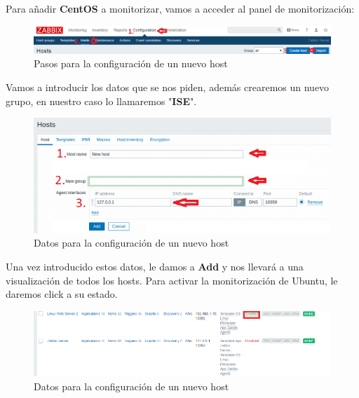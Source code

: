 \documentclass[12pt,a4paper]{article}
\begin{document}
		Para añadir \textbf{CentOS} a monitorizar, vamos a acceder al panel de monitorización:
		
		\begin{figure}[h]
			\centering
			\includegraphics[width=1.0\textwidth]{images/host.png}
			\caption{Pasos para la configuración de un nuevo host}
		\end{figure}
		Vamos a introducir los datos que se nos piden, además crearemos un nuevo grupo, en nuestro caso lo llamaremos "\textbf{ISE}".
		\newline
		\begin{figure}[h]
			\centering
			\includegraphics[width=1.0\textwidth]{images/newhost.png}
			\caption{Datos para la configuración de un nuevo host}
		\end{figure}
		\newline
		Una vez introducido estos datos, le damos a \textbf{Add} y nos llevará a una visualización de todos los hosts.
		\newline
		\newline
		Para activar la monitorización de Ubuntu, le daremos click a su estado.
		\newline
		\begin{figure}[h]
			\centering
			\includegraphics[width=1.0\textwidth]{images/acthost.png}
			\caption{Datos para la configuración de un nuevo host}
		\end{figure}
		\newline
\end{document}

